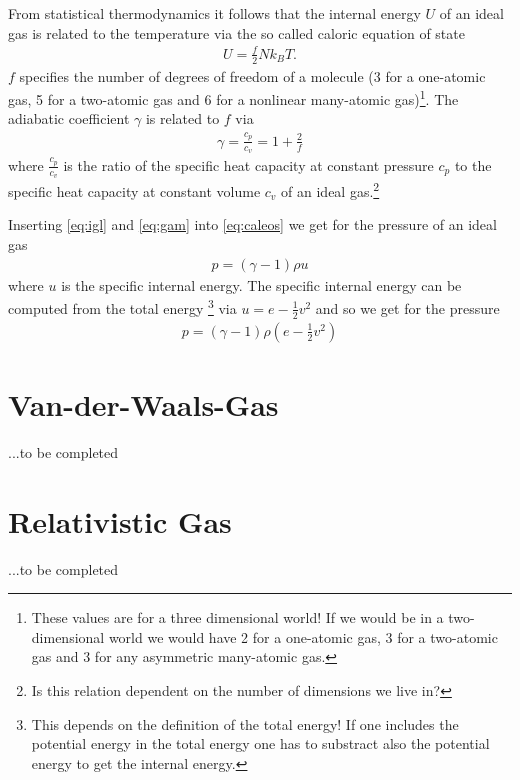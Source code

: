 \documentclass[a4paper,
					12pt,
					twoside,
					openright
					]{book}
\newcommand{\lra}[1]{{ \left( #1 \right) }}
\begin{document}
From statistical thermodynamics it follows that the
internal energy $U$ of an ideal gas is related to the temperature via the
so called caloric equation of state
\begin{align}
U = \frac{f}{2}N k_B T. \label{eq:caleos}
\end{align}
$f$ specifies the number of degrees of freedom of a molecule (3 for a 
one-atomic gas, 5 for a two-atomic gas and 6 for a nonlinear many-atomic
gas)\footnote{These values are for a three dimensional world! If we would be
in a two-dimensional world we would have 2 for a 
one-atomic gas, 3 for a two-atomic gas and 3 for
any asymmetric many-atomic gas.}.
The adiabatic coefficient $\gamma$ is related to $f$ via
\begin{align}
\gamma = \frac{c_p}{c_v} = 1 + \frac{2}{f} \label{eq:gam}
\end{align}
where $\frac{c_p}{c_v}$ is the ratio of the specific
heat capacity at constant pressure $c_p$ to the specific heat capacity at
constant volume $c_v$ of an ideal gas.\footnote{Is this relation dependent on
the number of dimensions we live in?}

Inserting \eqref{eq:igl} and \eqref{eq:gam} into \eqref{eq:caleos} we get for
the pressure of an ideal gas
\begin{align}
p=(\gamma-1) \rho u \label{eq:igpress}
\end{align}
where $u$ is the specific internal energy. The specific internal energy can be
computed from the total energy \footnote{This depends
 on the definition of the total energy! If one includes the potential energy
in the total energy one has to substract also the potential energy to get the
internal energy.} via $u=e-\frac{1}{2}v^2$ and so we get for the
pressure
\begin{align}
p=\lra{\gamma-1} \rho \lra{e-\frac{1}{2}v^2}
\end{align}

\section{Van-der-Waals-Gas}

...to be completed

\section{Relativistic Gas}

...to be completed
\end{document}
